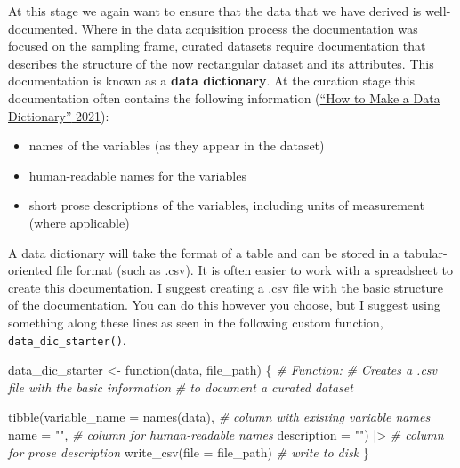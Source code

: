 \documentclass[
  letterpaper,
  DIV=11,
  numbers=noendperiod]{scrreport}
\newenvironment{Shaded}{\begin{snugshade}}{\end{snugshade}}
\newcommand{\AttributeTok}[1]{\textcolor[rgb]{0.00,0.00,0.00}{#1}}
\newcommand{\CommentTok}[1]{\textcolor[rgb]{0.00,0.00,0.00}{\textit{#1}}}
\newcommand{\ControlFlowTok}[1]{\textcolor[rgb]{0.00,0.00,0.00}{#1}}
\newcommand{\FunctionTok}[1]{\textcolor[rgb]{0.00,0.00,0.00}{#1}}
\newcommand{\NormalTok}[1]{\textcolor[rgb]{0.00,0.00,0.00}{#1}}
\newcommand{\OtherTok}[1]{\textcolor[rgb]{0.00,0.00,0.00}{#1}}
\newcommand{\SpecialCharTok}[1]{\textcolor[rgb]{0.00,0.00,0.00}{#1}}
\newcommand{\StringTok}[1]{\textcolor[rgb]{0.00,0.00,0.00}{#1}}
\providecommand{\tightlist}{%
  \setlength{\itemsep}{0pt}\setlength{\parskip}{0pt}}\usepackage{longtable,booktabs,array}
\theoremstyle{definition}
\theoremstyle{remark}
\begin{document}
At this stage we again want to ensure that the data that we have derived
is well-documented. Where in the data acquisition process the
documentation was focused on the sampling frame, curated datasets
require documentation that describes the structure of the now
rectangular dataset and its attributes. This documentation is known as a
\textbf{data dictionary}. At the curation stage this documentation often
contains the following information
(\protect\hyperlink{ref-HowMakeData10-2021}{{``How to Make a Data
Dictionary''} 2021}):

\begin{itemize}
\tightlist
\item
  names of the variables (as they appear in the dataset)
\item
  human-readable names for the variables
\item
  short prose descriptions of the variables, including units of
  measurement (where applicable)
\end{itemize}

A data dictionary will take the format of a table and can be stored in a
tabular-oriented file format (such as .csv). It is often easier to work
with a spreadsheet to create this documentation. I suggest creating a
.csv file with the basic structure of the documentation. You can do this
however you choose, but I suggest using something along these lines as
seen in the following custom function, \texttt{data\_dic\_starter()}.

\begin{Shaded}
\begin{Highlighting}[]
\NormalTok{data\_dic\_starter }\OtherTok{\textless{}{-}} \ControlFlowTok{function}\NormalTok{(data, file\_path) \{}
  \CommentTok{\# Function:}
  \CommentTok{\# Creates a .csv file with the basic information}
  \CommentTok{\# to document a curated dataset}
  
  \FunctionTok{tibble}\NormalTok{(}\AttributeTok{variable\_name =} \FunctionTok{names}\NormalTok{(data), }\CommentTok{\# column with existing variable names }
       \AttributeTok{name =} \StringTok{""}\NormalTok{, }\CommentTok{\# column for human{-}readable names}
       \AttributeTok{description =} \StringTok{""}\NormalTok{) }\SpecialCharTok{|\textgreater{}} \CommentTok{\# column for prose description}
  \FunctionTok{write\_csv}\NormalTok{(}\AttributeTok{file =}\NormalTok{ file\_path) }\CommentTok{\# write to disk}
\NormalTok{\}}
\end{Highlighting}
\end{Shaded}
\end{document}
